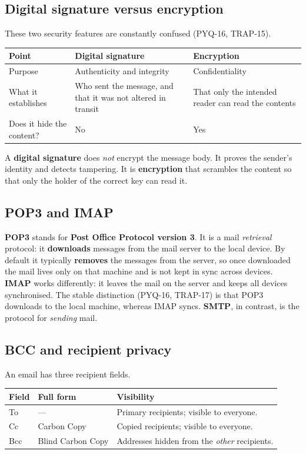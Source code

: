\subsection*{Digital signature versus encryption}
These two security features are constantly confused (PYQ-16, TRAP-15).

\begin{center}
\begin{tabular}{p{}p{}p{}}
\toprule
\textbf{Point} & \textbf{Digital signature} & \textbf{Encryption} \\
\midrule
Purpose & Authenticity and integrity & Confidentiality \\
What it establishes & Who sent the message, and that it was not altered in
transit & That only the intended reader can read the contents \\
Does it hide the content? & No & Yes \\
\bottomrule
\end{tabular}
\end{center}

A \textbf{digital signature} does \emph{not} encrypt the message body. It
proves the sender's identity and detects tampering. It is \textbf{encryption}
that scrambles the content so that only the holder of the correct key can read
it.

\subsection*{POP3 and IMAP}
\textbf{POP3} stands for \textbf{Post Office Protocol version 3}. It is a mail
\emph{retrieval} protocol: it \textbf{downloads} messages from the mail server
to the local device. By default it typically \textbf{removes} the messages
from the server, so once downloaded the mail lives only on that machine and is
not kept in sync across devices. \textbf{IMAP} works differently: it leaves
the mail on the server and keeps all devices synchronised. The stable
distinction (PYQ-16, TRAP-17) is that POP3 downloads to the local machine,
whereas IMAP syncs. \textbf{SMTP}, in contrast, is the protocol for
\emph{sending} mail.

\subsection*{BCC and recipient privacy}
An email has three recipient fields.

\begin{center}
\begin{tabular}{p{}p{}p{}}
\toprule
\textbf{Field} & \textbf{Full form} & \textbf{Visibility} \\
\midrule
To & --- & Primary recipients; visible to everyone. \\
Cc & Carbon Copy & Copied recipients; visible to everyone. \\
Bcc & Blind Carbon Copy & Addresses hidden from the \emph{other} recipients. \\
\bottomrule
\end{tabular}
\end{center}

